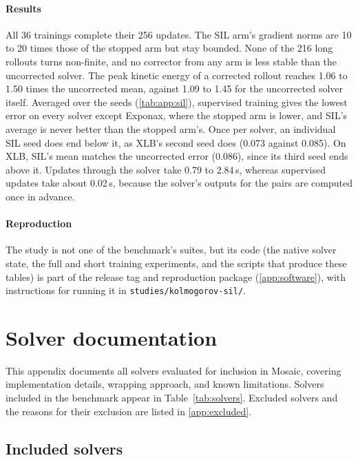 \paragraph{Results}
All 36 trainings complete their 256 updates. The SIL arm's gradient norms are
10 to 20 times those of the stopped arm but stay bounded. None of the 216 long
rollouts turns non-finite, and no corrector from any arm is less stable than
the uncorrected solver. The peak kinetic energy of a corrected rollout reaches 1.06
to 1.50 times the uncorrected mean, against 1.09 to 1.45 for the uncorrected
solver itself. Averaged over the seeds (\cref{tab:app:sil}), supervised training
gives the lowest error on every solver except Exponax, where the stopped arm is
lower, and SIL's average is never better than the stopped arm's. Once per
solver, an individual SIL seed does end below it, as XLB's second seed does
(0.073 against 0.085). On XLB, SIL's mean matches the uncorrected error (0.086), since its third
seed ends above it. Updates through the solver take 0.79 to 2.84\,s, whereas
supervised updates take about 0.02\,s, because the solver's outputs for the pairs
are computed once in advance.

\paragraph{Reproduction}
The study is not one of the benchmark's suites, but its code (the native
solver state, the full and short training experiments, and the scripts that
produce these tables) is part of the release tag and reproduction package
(\cref{app:software}), with instructions for running it in
\texttt{studies/kolmogorov-sil/}.

\section{Solver documentation}
\label{app:solvers}

This appendix documents all solvers evaluated for inclusion in Mosaic,
covering implementation details, wrapping approach, and known limitations.
Solvers included in the benchmark appear in Table~\ref{tab:solvers}.
Excluded solvers and the reasons for their exclusion are listed in
\cref{app:excluded}.

\subsection{Included solvers}
\label{app:included}

